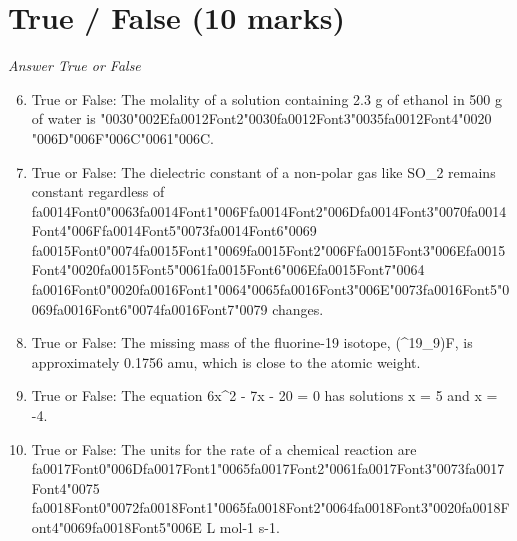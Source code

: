 \documentclass[12pt]{article}
\begin{document}
\section*{True / False (10 marks)}
\textit{Answer True or False}
\begin{enumerate}[label=\arabic*.]
\setcounter{enumi}{5}
\item True or False: The molality of a solution containing 2.3 g of ethanol in 500 g of water is {\char"0030}{\char"002E}{\csname fa0012Font2\endcsname\char"0030}{\csname fa0012Font3\endcsname\char"0035}{\csname fa0012Font4\endcsname\char"0020} {\char"006D}{\char"006F}{\char"006C}{\char"0061}{\char"006C}.
\item True or False: The dielectric constant of a non-polar gas like SO\_2 remains constant regardless of {\csname fa0014Font0\endcsname\char"0063}{\csname fa0014Font1\endcsname\char"006F}{\csname fa0014Font2\endcsname\char"006D}{\csname fa0014Font3\endcsname\char"0070}{\csname fa0014Font4\endcsname\char"006F}{\csname fa0014Font5\endcsname\char"0073}{\csname fa0014Font6\endcsname\char"0069} {\csname fa0015Font0\endcsname\char"0074}{\csname fa0015Font1\endcsname\char"0069}{\csname fa0015Font2\endcsname\char"006F}{\csname fa0015Font3\endcsname\char"006E}{\csname fa0015Font4\endcsname\char"0020}{\csname fa0015Font5\endcsname\char"0061}{\csname fa0015Font6\endcsname\char"006E}{\csname fa0015Font7\endcsname\char"0064} {\csname fa0016Font0\endcsname\char"0020}{\csname fa0016Font1\endcsname\char"0064}{\char"0065}{\csname fa0016Font3\endcsname\char"006E}{\char"0073}{\csname fa0016Font5\endcsname\char"0069}{\csname fa0016Font6\endcsname\char"0074}{\csname fa0016Font7\endcsname\char"0079} changes.
\item True or False: The missing mass of the fluorine-19 isotope, (\^{}19\_9)F, is approximately 0.1756 amu, which is close to the atomic weight.
\item True or False: The equation 6x\^{}2 - 7x - 20 = 0 has solutions x = 5 and x = -4.
\item True or False: The units for the rate of a chemical reaction are {\csname fa0017Font0\endcsname\char"006D}{\csname fa0017Font1\endcsname\char"0065}{\csname fa0017Font2\endcsname\char"0061}{\csname fa0017Font3\endcsname\char"0073}{\csname fa0017Font4\endcsname\char"0075} {\csname fa0018Font0\endcsname\char"0072}{\csname fa0018Font1\endcsname\char"0065}{\csname fa0018Font2\endcsname\char"0064}{\csname fa0018Font3\endcsname\char"0020}{\csname fa0018Font4\endcsname\char"0069}{\csname fa0018Font5\endcsname\char"006E} L mol-1 s-1.
\end{enumerate}
\end{document}
